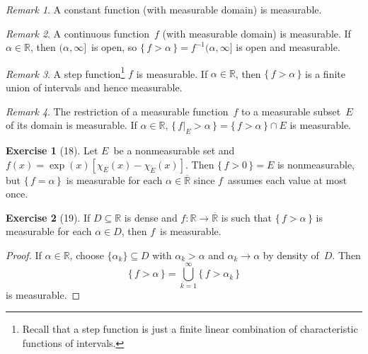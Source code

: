 \documentclass[letterpaper,12pt]{article}
\newcommand{\R}{\mathbb{R}}
\newcommand{\Rex}{\overline{\R}}
\newcommand{\sect}{\cap}
\newcommand{\bigunion}{\bigcup}
\newcommand{\comp}[1]{\widetilde{#1}}
\newcommand{\res}[2]{{#1}|_{#2}}
\newcommand{\chr}[1]{\chi_{#1}}
\theoremstyle{plain}
\theoremstyle{definition}
\newtheorem*{exer}{Exercise}
\theoremstyle{remark}
\newtheorem*{rmk}{Remark}
\begin{document}
\begin{rmk}
A constant function (with measurable domain) is measurable.
\end{rmk}

\begin{rmk}
A continuous function~\(f\) (with measurable domain) is measurable. If \(\alpha\in\R\), then \((\alpha,\infty]\)~is open, so \(\{\,f>\alpha\,\}=f^{-1}(\alpha,\infty]\) is open and measurable.
\end{rmk}

\begin{rmk}
A step function\footnote{Recall that a step function is just a finite linear combination of characteristic functions of intervals.} \(f\) is measurable. If \(\alpha\in\R\), then \(\{\,f>\alpha\,\}\) is a finite union of intervals and hence measurable.
\end{rmk}

\begin{rmk}
The restriction of a measurable function~\(f\) to a measurable subset~\(E\) of its domain is measurable. If \(\alpha\in\R\), \(\{\,\res{f}{E}>\alpha\,\}=\{\,f>\alpha\,\}\sect E\) is measurable.
\end{rmk}

\begin{exer}[18]
Let \(E\)~be a nonmeasurable set and \(f(x)=\exp(x)[\chr{E}(x)-\chr{\comp{E}}(x)]\). Then \(\{\,f>0\,\}=E\) is nonmeasurable, but \(\{\,f=\alpha\,\}\)~is measurable for each \(\alpha\in\Rex\) since \(f\)~assumes each value at most once.
\end{exer}

\begin{exer}[19]
If \(D\subseteq\R\) is dense and \(f:\R\to\Rex\) is such that \(\{\,f>\alpha\,\}\) is measurable for each \(\alpha\in D\), then \(f\)~is measurable.
\end{exer}
\begin{proof}
If \(\alpha\in\R\), choose \(\{\alpha_k\}\subseteq D\) with \(\alpha_k>\alpha\) and \(\alpha_k\to\alpha\) by density of~\(D\). Then
\[\{\,f>\alpha\,\}=\bigunion_{k=1}^{\infty}\{\,f>\alpha_k\,\}\]
is measurable.
\end{proof}
\end{document}
